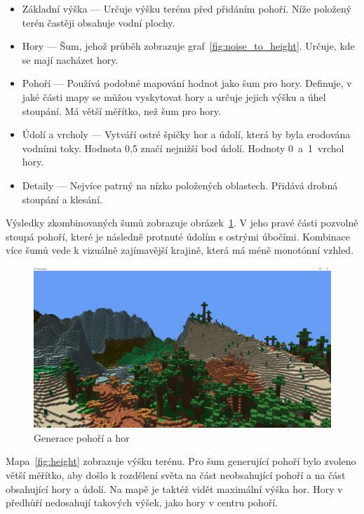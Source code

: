 \documentclass[thesis=M,czech]{FITthesis}[2019/12/23]
\begin{document}
\begin{itemize}
\item Základní výška --- Určuje výšku terénu před přidáním pohoří. Níže položený terén častěji obsahuje vodní plochy.

\item Hory --- Šum, jehož průběh zobrazuje graf~\ref{fig:noise_to_height}. Určuje, kde se mají nacházet hory.

\item Pohoří --- Používá podobné mapování hodnot jako šum pro hory. Definuje, v jaké části mapy se můžou vyskytovat hory a určuje jejich výšku a úhel stoupání. Má větší měřítko, než šum pro hory. 

\item Údolí a vrcholy --- Vytváří ostré špičky hor a údolí, která by byla erodována vodními toky. Hodnota 0,5 značí nejnižší bod údolí. Hodnoty 0~a~1~vrchol hory.

\item Detaily --- Nejvíce patrný na nízko položených oblastech. Přidává drobná stoupání a klesání.
\end{itemize}

Výsledky zkombinovaných šumů zobrazuje obrázek~\ref{fig:mountains}. V jeho pravé části pozvolně stoupá pohoří, které je následně protnuté údolím s ostrými úbočími. Kombinace více šumů vede k vizuálně zajímavější krajině, která má méně monotónní vzhled.

\begin{figure}\centering
	\includegraphics[width=\textwidth]{images/world_gen/mountains}
	\caption[Generace pohoří a hor]{Generace pohoří a hor}\label{fig:mountains}
\end{figure}

Mapa~\ref{fig:height} zobrazuje výšku terénu. Pro šum generující pohoří bylo zvoleno větší měřítko, aby došlo k rozdělení světa na část neobsahující pohoří a na část obsahující hory a údolí. Na mapě je taktéž vidět maximální výška hor. Hory v předhůří nedosahují takových výšek, jako hory v centru pohoří.
\end{document}
